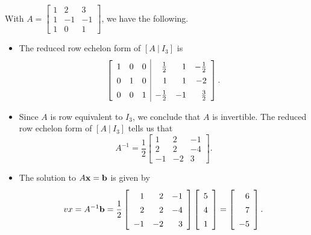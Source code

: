 \begin{example}
\ExampleSolution
\ba
\item With $A = \left[ \begin{array}{crr} 1&2&3 \\ 1&-1&-1 \\ 1&0&1 \end{array} \right]$, we have the following.
\begin{itemize}
\item The reduced row echelon form of $[A \ | \ I_3]$ is 
\[ \left[ \renewcommand{\arraystretch}{1.4}  \begin{array}{ccc|rrr} 1&0&0&\frac{1}{2}&1&-\frac{1}{2} \\ 0&1&0&1&1&-2  \\ 0&0&1&-\frac{1}{2}&-1&\frac{3}{2} \end{array} \right].\]
\item Since $A$ is row equivalent to $I_3$, we conclude that $A$ is invertible. The reduced row echelon form of $[A \ | \ I_3]$ tells us that 
\[A^{-1} = \frac{1}{2} \left[ \begin{array}{rrr} 1&2&-1 \\ 2&2&-4 \\ -1&-2&3 \end{array} \right].\]
\item The solution to $A \mathbf{x} = \mathbf{b}$ is given by 
\[vx = A^{-1} \vb = \frac{1}{2} \left[ \begin{array}{rrr} 1&2&-1 \\ 2&2&-4 \\ -1&-2&3 \end{array} \right] \left[ \begin{array}{c} 5\\4\\1 \end{array} \right] = \left[ \begin{array}{r} 6\\7\\-5 \end{array} \right].\]
\end{itemize}


\end{example}
